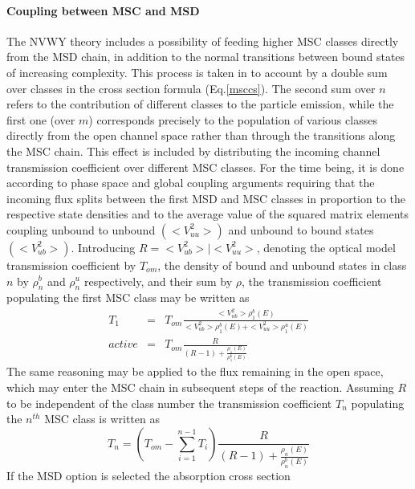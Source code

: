 \documentclass[twocolumn,amsmath,amssymb,10pt,groupedaddress,a4paper]{revtex4}
\begin{document}
\paragraph{Coupling between MSC and MSD}
The NVWY theory includes a possibility of feeding higher
MSC classes directly from the MSD chain, in addition to
the normal transitions between bound states of increasing complexity.
This process is taken in to account by a double sum over classes in
the cross section formula (Eq.\ref{msccs}). The second sum over $n$
refers to the contribution of different classes to the particle emission,
while the first one (over $m$) corresponds precisely to the population
of various classes directly from the open channel space rather than
through the transitions along the MSC chain. This effect is included
by distributing the incoming channel transmission
coefficient over different MSC classes. For the time being,
it is done according to phase space and global coupling arguments
requiring that the incoming flux splits between the first MSD
and MSC classes in proportion to the respective state densities and
to the average value of the squared matrix elements coupling unbound
to unbound $(<V_{uu}^{2}>)$ and unbound to bound states $(<V_{ub}^{2}>)$.
Introducing $R=<V_{ub}^{2}>\mid<V_{uu}^{2}>$, denoting the optical
model transmission coefficient by $T_{om}$, the density of bound
and unbound states in class $n$ by $\rho_{n}^{b}$ and $\rho_{n}^{u}$
respectively, and their sum by $\rho$, the transmission coefficient
populating the first MSC class may be written as
\begin{eqnarray}
T_{1}&=&T_{om}\frac{<V_{ub}^{2}>\rho_{1}^{b}(E)}{<V_{ub}^{2}>\rho_{1}^{b}(E)+<V_{uu}^{2}>\rho_{1}^{u}(E)}\nonumber\\active
&=&T_{om}\frac{R}{(R-1)+\frac{\rho_{1}(E)}{\rho_{1}^{b}(E)}}\label{eq9}
\end{eqnarray}
The same reasoning may be applied to the flux remaining in the open
space, which may enter the MSC chain in subsequent steps
of the reaction. Assuming $R$ to be independent of the class number
the transmission coefficient $T_{n}$ populating the $n^{th}$ MSC
class is written as
\begin{equation}
T_{n}=\left(T_{om}-\sum_{i=1}^{n-1}T_{i}\right)\frac{R}{(R-1)+\frac{\rho_{n}(E)}{\rho_{n}^{b}(E)}}\label{eq10}\end{equation}
If the MSD option is selected the absorption cross section
\end{document}
